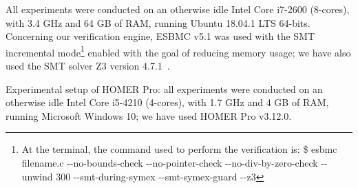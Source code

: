 \documentclass[journal]{IEEEtran}
\begin{document}
All experiments were conducted on an otherwise idle Intel Core i7-2600 (8-cores), with 3.4 GHz and 64 GB of RAM, running Ubuntu 18.04.1 LTS 64-bits. Concerning our verification engine, ESBMC v5.1 was used with the SMT incremental mode\footnote{At the terminal, the command used to perform the verification is: \$ esbmc filename.c -\phantom{}-no-bounds-check -\phantom{}-no-pointer-check -\phantom{}-no-div-by-zero-check -\phantom{}-unwind 300 -\phantom{}-smt-during-symex -\phantom{}-smt-symex-guard -\phantom{}-z3} enabled with the goal of reducing memory usage; we have also used the SMT solver Z3 version 4.7.1~\cite{DeMoura}.

Experimental setup of HOMER Pro: all experiments were conducted on an otherwise idle Intel Core i5-4210 (4-cores), with 1.7 GHz and 4 GB of RAM, running Microsoft Windows 10; we have used HOMER Pro v3.12.0.

\end{document}
